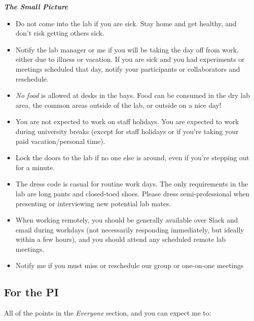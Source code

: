 \documentclass[
]{book}
\providecommand{\tightlist}{%
  \setlength{\itemsep}{0pt}\setlength{\parskip}{0pt}}
\begin{document}
\textbf{\emph{The Small Picture}}

\begin{itemize}
\tightlist
\item
  Do not come into the lab if you are sick. Stay home and get healthy, and don't risk getting others sick.
\item
  Notify the lab manager or me if you will be taking the day off from work, either due to illness or vacation. If you are sick and you had experiments or meetings scheduled that day, notify your participants or collaborators and reschedule.
\item
  \emph{No food} is allowed at desks in the bays. Food can be consumed in the dry lab area, the common areas outside of the lab, or outside on a nice day!
\item
  You are not expected to work on staff holidays. You are expected to work during university breaks (except for staff holidays or if you're taking your paid vacation/personal time).
\item
  Lock the doors to the lab if no one else is around, even if you're stepping out for a minute.
\item
  The dress code is casual for routine work days. The only requirements in the lab are long pants and closed-toed shoes. Please dress semi-professional when presenting or interviewing new potential lab mates.\\
\item
  When working remotely, you should be generally available over Slack and email during workdays (not necessarily responding immediately, but ideally within a few hours), and you should attend any scheduled remote lab meetings.
\item
  Notify me if you must miss or reschedule our group or one-on-one meetings
\end{itemize}

\hypertarget{for-the-pi}{%
\subsection{For the PI}\label{for-the-pi}}

All of the points in the \emph{Everyone} section, and you can expect me to:
\end{document}
